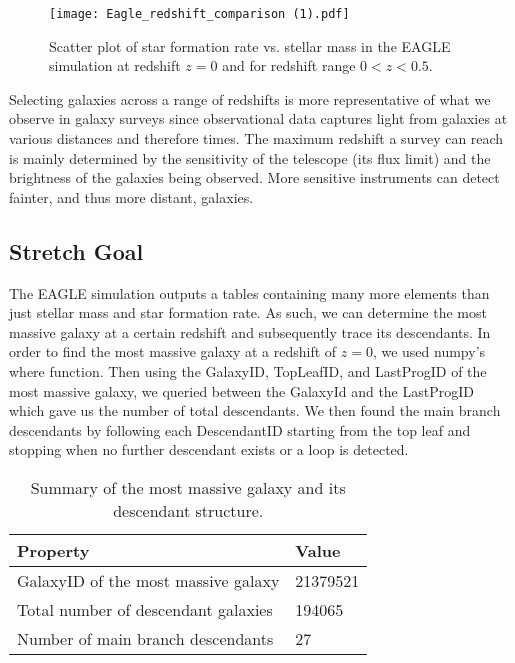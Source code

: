 \documentclass[10pt]{article}
\begin{document}
\begin{figure}[H]
    \centering
    \texttt{[image: Eagle\_redshift\_comparison (1).pdf]}
    \caption{Scatter plot  of star formation rate vs. stellar mass in the EAGLE simulation at redshift $z=0$ and for redshift range $0<z<0.5$.}
    \label{fig:eagle_both_redshifts}
\end{figure}


Selecting galaxies across a range of redshifts is more representative of what we observe in galaxy surveys since observational data captures light from galaxies at various distances and therefore times. The maximum redshift a survey can reach is mainly determined by the sensitivity of the telescope (its flux limit) and the brightness of the galaxies being observed. More sensitive instruments can detect fainter, and thus more distant, galaxies.

\subsection{Stretch Goal}
The EAGLE simulation outputs a tables containing many more elements than just stellar mass and star formation rate. As such, we can determine the most massive galaxy at a certain redshift and subsequently trace its descendants. In order to find the most massive galaxy at a redshift of $z=0$, we used numpy's where function. Then using the GalaxyID, TopLeafID, and LastProgID of the most massive galaxy, we queried between the GalaxyId and the LastProgID which gave us the number of total descendants. We then found the main branch descendants by following each DescendantID starting from the top leaf and stopping when no further descendant exists or a loop is detected. 

\begin{table}[H]
    \centering
    \begin{tabular}{@{}ll@{}}
        \toprule
        \textbf{Property} & \textbf{Value} \\
        \midrule
        GalaxyID of the most massive galaxy & 21379521 \\
        Total number of descendant galaxies & 194065 \\
        Number of main branch descendants   & 27 \\
        \bottomrule
    \end{tabular}
    \caption{Summary of the most massive galaxy and its descendant structure.}
    \label{tab:most_massive_summary}
\end{table}
\end{document}
